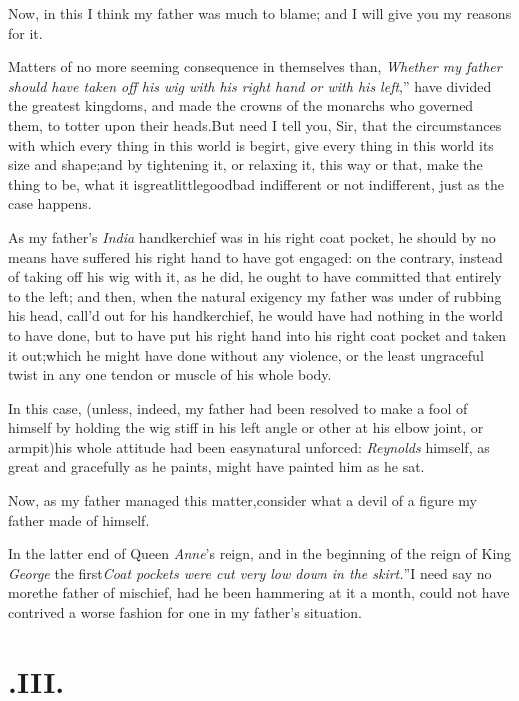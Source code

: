 \documentclass{article}
\begin{document}
\tsh Now, in this I think my father was much to blame;
and I will give you my reasons for it.

Matters of no more seeming consequence in themselves than,
\lqq\textit{Whether\break
my father should have taken off his wig\break
with his right hand or with his left},”\tsh\break
have divided the greatest kingdoms, and made the crowns of the
monarchs who governed them, to totter upon their\break
heads.\tsk But need I tell you, Sir, that the circumstances with
which every thing in this world is begirt, give every thing in
this world its size and shape;\tsk and by tightening it, or
relaxing it, this way or that, make the thing to be, what it
is\tsh\break great\tsk little\tsk good\tsk bad\tsk
indifferent or not indifferent, just
as the case happens.

As my father’s \textit{India} handkerchief was in his right coat pocket, he should
by no means have suffered his right hand to have got engaged: on the contrary,
instead of taking off his wig with it, as he did, he ought to have committed that
entirely to the left; and then, when the natural exigency my father was under of
rubbing his head, call’d out for his handkerchief, he would have had nothing in the
world to have done, but to have put his right hand into his right coat pocket and
taken it out;\tsk which he might have done without any violence, or the least
ungraceful twist in any one tendon or muscle of his whole body.

In this case, (unless, indeed, my father had been resolved to make a fool of himself
by holding the wig stiff in his left  angle or
other at his elbow joint, or arm\-pit)\tsk his whole attitude had been easy\tsk natural\tsk
unforced: \textit{Reynolds} himself, as great and gracefully as he paints, might
have painted him as he sat.

Now, as my father managed this matter,\tsk consider what a
devil of a figure my father made of himself.

\tsk In the latter end of Queen \textit{Anne}’s reign, and in the beginning of the
reign of King \textit{George} the first\tsk \lqq\textit{Coat pockets were cut very low
down in the skirt.}”\tsh I need say no more\tsh the father of mischief, had he been
hammering at it a month, could not have contrived a worse fashion for one in my
father’s situation.

\section{.\quad  III.}
\end{document}
